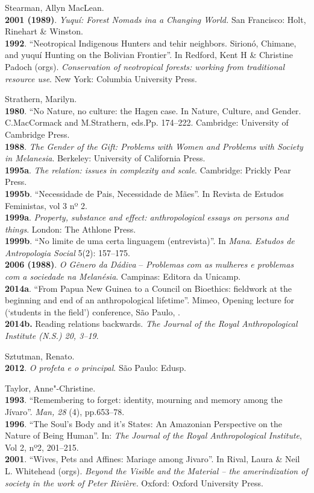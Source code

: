 \begin{Parskip}
Stearman, Allyn MacLean.\\
\textbf{2001 (1989)}. \emph{Yuquí: Forest Nomads ina a Changing World.}
San Francisco: Holt, Rinehart \& Winston.\\
\textbf{1992}. ``Neotropical Indigenous Hunters and tehir neighbors.
Sirionó, Chimane, and yuquí Hunting on the Bolivian Frontier''. In
Redford, Kent H \& Christine Padoch (orgs). \emph{Conservation of
neotropical forests: working from traditional resource use}. New York:
Columbia University Press.

Strathern, Marilyn.\\
\textbf{1980}. ``No Nature, no culture: the Hagen case. In Nature,
Culture, and Gender. C.MacCormack and M.Strathern, eds.Pp. 174--222.
Cambridge: University of Cambridge Press.\\
\textbf{1988}. \emph{The Gender of the Gift: Problems with Women and
Problems with Society in Melanesia}. Berkeley: University of California
Press.\\
\textbf{1995a}. \emph{The relation: issues in complexity and scale}.
Cambridge: Prickly Pear Press.\\
\textbf{1995b}. ``Necessidade de Pais, Necessidade de Mães''. In Revista
de Estudos Feministas, vol 3 nº 2.\\
\textbf{1999a}. \emph{Property, substance and effect: anthropological
essays on persons and things}. London: The Athlone Press.\\
\textbf{1999b}. ``No limite de uma certa linguagem (entrevista)''. In
\emph{Mana}. \emph{Estudos de Antropologia Social} 5(2): 157--175.\\
\textbf{2006 (1988)}. \emph{O Gênero da Dádiva} -- \emph{Problemas com as
mulheres e problemas com a sociedade na Melanésia}. Campinas: Editora da
Unicamp.\\
\textbf{2014a}. ``From Papua New Guinea to a  Council on Bioethics:
fieldwork at the beginning and end of an anthropological lifetime''.
Mimeo, Opening lecture for   (`students in the field') conference,
São Paulo, .\\
\textbf{2014b.} Reading relations backwards. \emph{The Journal of the
Royal Anthropological Institute (N.S.) 20, 3--19}.

Sztutman, Renato.\\
\textbf{2012}. \emph{O profeta e o principal}. São Paulo: Edusp.

Taylor, Anne"-Christine.\\
\textbf{1993}. ``Remembering to forget: identity, mourning and memory
among the Jívaro''. \emph{Man, 28} (4), pp.653--78.\\
\textbf{1996}. ``The Soul's Body and it's States: An Amazonian
Perspective on the Nature of Being Human''. In: \emph{The} \emph{Journal}
\emph{of the Royal Anthropological Institute}, Vol 2, nº2, 201--215.\\
\textbf{2001}. ``Wives, Pets and Affines: Mariage among Jivaro''. In
Rival, Laura \& Neil L. Whitehead (orgs). \emph{Beyond the Visible and
the Material -- the amerindization of society in the work of Peter
Rivière.} Oxford: Oxford University Press.


\end{Parskip}
